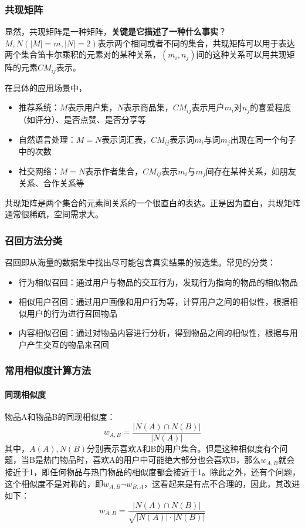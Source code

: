 \subsubsection{共现矩阵}
显然，共现矩阵是一种矩阵，\textbf{关键是它描述了一种什么事实}？$M, N(|M| = m, |N| = 2)$表示两个相同或者不同的集合，共现矩阵可以用于表达两个集合笛卡尔乘积的元素对的某种关系，$(m_i, n_j)$间的这种关系可以用共现矩阵的元素$CM_{ij}$表示。

在具体的应用场景中，
\begin{itemize}
	\item 推荐系统：$M$表示用户集，$N$表示商品集，$CM_{ij}$表示用户$m_i$对$n_j$的喜爱程度（如评分）、是否点赞、是否分享等
	\item 自然语言处理：$M = N$表示词汇表，$CM_{ij}$表示词$m_i$与词$m_j$出现在同一个句子中的次数
	\item 社交网络：$M=N$表示作者集合，$CM_{ij}$表示$m_i$与$m_j$间存在某种关系，如朋友关系、合作关系等
\end{itemize}
共现矩阵是两个集合的元素间关系的一个很直白的表达。正是因为直白，共现矩阵通常很稀疏，空间需求大。

\subsubsection{召回方法分类}
召回即从海量的数据集中找出尽可能包含真实结果的候选集。常见的分类：
\begin{itemize}
	\item 行为相似召回：通过用户与物品的交互行为，发现行为指向的物品的相似物品
	\item 相似用户召回：通过用户画像和用户行为等，计算用户之间的相似性，根据相似用户的行为进行召回物品
	\item 内容相似召回：通过对物品内容进行分析，得到物品之间的相似性，根据与用户产生交互的物品来召回
\end{itemize}


\subsubsection{常用相似度计算方法}
\paragraph{同现相似度}
物品A和物品B的同现相似度：
$$
w_{A,B} = \frac{|N(A) \cap N(B)|}{|N(A)|}
$$
其中，$A(A), N(B)$分别表示喜欢A和B的用户集合。但是这种相似度有个问题，当B是热门物品时，喜欢A的用户中可能绝大部分也会喜欢B，那么$w_{A,B}$就会接近于1，即任何物品与热门物品的相似度都会接近于1。除此之外，还有个问题，这个相似度不是对称的，即$w_{A,B} \neg w_{B,A}$，这看起来是有点不合理的，因此，其改进如下：
$$
w_{A,B} = \frac{|N(A) \cap N(B)|}{\sqrt{|N(A)| \cdot |N(B)|}}
$$

